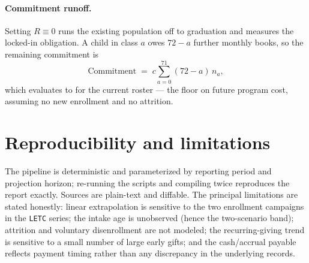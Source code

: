 \paragraph{Commitment runoff.} Setting $R \equiv 0$ runs the existing population off
to graduation and measures the locked-in obligation. A child in class $a$ owes
$72-a$ further monthly books, so the remaining commitment is
\begin{equation}
\text{Commitment} \;=\; c \sum_{a=0}^{71} (72 - a)\, n_a,
\end{equation}
which evaluates to \ilsaCohortRunoffTotal{} for the current roster --- the floor on
future program cost, assuming no new enrollment and no attrition.

\section{Reproducibility and limitations}

The pipeline is deterministic and parameterized by reporting period and projection
horizon; re-running the scripts and compiling twice reproduces the report exactly.
Sources are plain-text and diffable. The principal limitations are stated honestly:
linear extrapolation is sensitive to the two enrollment campaigns in the
\texttt{LETC} series; the intake age is unobserved (hence the two-scenario band);
attrition and voluntary disenrollment are not modeled; the recurring-giving trend is
sensitive to a small number of large early gifts; and the cash/accrual payable
reflects payment timing rather than any discrepancy in the underlying records.
